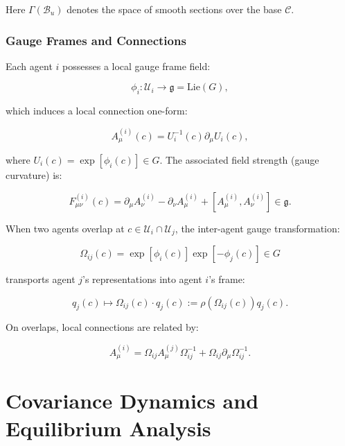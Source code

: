 \documentclass[twoside,11pt]{article}
\begin{document}
Here $\Gamma(\mathcal{B}_u)$ denotes the space of smooth sections over the base $\mathcal{C}$.

\subsubsection{Gauge Frames and Connections}
Each agent $i$ possesses a local gauge frame field:

\begin{equation}
\phi_i: \mathcal{U}_i \to \mathfrak{g} = \text{Lie}(G),
\end{equation}

which induces a local connection one-form:

\begin{equation}
A^{(i)}_\mu(c) = U_i^{-1}(c) \partial_\mu U_i(c),
\end{equation}

where $U_i(c) = \exp[\phi_i(c)] \in G$. The associated field strength (gauge curvature) is:

\begin{equation}
F^{(i)}_{\mu\nu}(c) = \partial_\mu A^{(i)}_\nu - \partial_\nu A^{(i)}_\mu + [A^{(i)}_\mu, A^{(i)}_\nu] \in \mathfrak{g}.
\end{equation}

When two agents overlap at $c \in \mathcal{U}_i \cap \mathcal{U}_j$, the inter-agent gauge transformation:

\begin{equation}
\Omega_{ij}(c) = \exp[\phi_i(c)] \exp[-\phi_j(c)] \in G
\end{equation}

transports agent $j$'s representations into agent $i$'s frame:

\begin{equation}
q_j(c) \mapsto \Omega_{ij}(c) \cdot q_j(c) := \rho(\Omega_{ij}(c)) q_j(c).
\end{equation}

On overlaps, local connections are related by:

\begin{equation}
A^{(i)}_\mu = \Omega_{ij} A^{(j)}_\mu \Omega_{ij}^{-1} + \Omega_{ij} \partial_\mu \Omega_{ij}^{-1}.
\end{equation}




\section{Covariance Dynamics and Equilibrium Analysis}
\label{app:covariance_dynamics}
\end{document}
